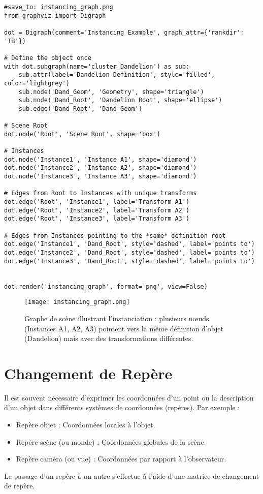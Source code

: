 \documentclass{article}
\begin{document}
\begin{verbatim}
#save_to: instancing_graph.png
from graphviz import Digraph

dot = Digraph(comment='Instancing Example', graph_attr={'rankdir': 'TB'})

# Define the object once
with dot.subgraph(name='cluster_Dandelion') as sub:
    sub.attr(label='Dandelion Definition', style='filled', color='lightgrey')
    sub.node('Dand_Geom', 'Geometry', shape='triangle')
    sub.node('Dand_Root', 'Dandelion Root', shape='ellipse')
    sub.edge('Dand_Root', 'Dand_Geom')

# Scene Root
dot.node('Root', 'Scene Root', shape='box')

# Instances
dot.node('Instance1', 'Instance A1', shape='diamond')
dot.node('Instance2', 'Instance A2', shape='diamond')
dot.node('Instance3', 'Instance A3', shape='diamond')

# Edges from Root to Instances with unique transforms
dot.edge('Root', 'Instance1', label='Transform A1')
dot.edge('Root', 'Instance2', label='Transform A2')
dot.edge('Root', 'Instance3', label='Transform A3')

# Edges from Instances pointing to the *same* definition root
dot.edge('Instance1', 'Dand_Root', style='dashed', label='points to')
dot.edge('Instance2', 'Dand_Root', style='dashed', label='points to')
dot.edge('Instance3', 'Dand_Root', style='dashed', label='points to')


dot.render('instancing_graph', format='png', view=False)
\end{verbatim}

\begin{figure}[H]
\centering
\texttt{[image: instancing\_graph.png]}
\caption{Graphe de scène illustrant l'instanciation : plusieurs nœuds (Instances A1, A2, A3) pointent vers la même définition d'objet (Dandelion) mais avec des transformations différentes.}
\label{fig:instancing_graph}
\end{figure}

\section{Changement de Repère}

Il est souvent nécessaire d'exprimer les coordonnées d'un point ou la description d'un objet dans différents systèmes de coordonnées (repères). Par exemple :
\begin{itemize}
    \item Repère objet : Coordonnées locales à l'objet.
    \item Repère scène (ou monde) : Coordonnées globales de la scène.
    \item Repère caméra (ou vue) : Coordonnées par rapport à l'observateur.
\end{itemize}
Le passage d'un repère à un autre s'effectue à l'aide d'une matrice de changement de repère.
\end{document}
